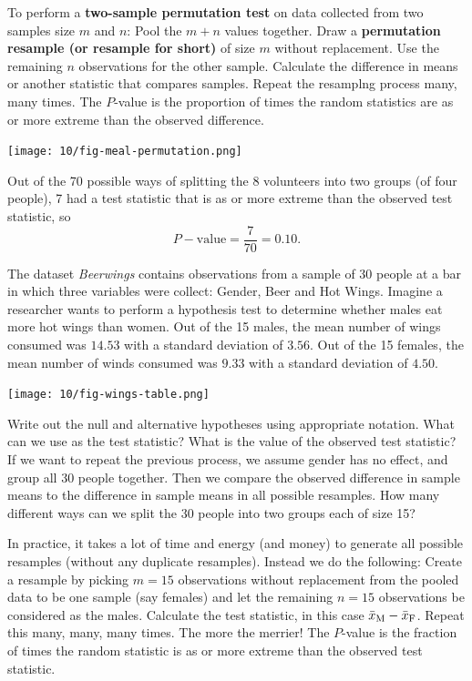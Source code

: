 \bbox
To perform a \textbf{two-sample permutation test} on data collected from two samples size $m$ and $n$:
\bi
\ii Pool the $m+n$ values together.
\ii Draw a \textbf{permutation resample (or resample for short)}  of size $m$ without replacement.
\ii Use the remaining $n$ observations for the other sample.
\ii Calculate the difference in means or another statistic that compares samples.
\ii Repeat the resamplng process many, many times.
\ii The $P$-value is the proportion of times the random statistics are as or more extreme than the observed difference.
\ei
\ebox

\clearpage

\begin{center}
\texttt{[image: 10/fig-meal-permutation.png]}
\end{center}

Out of the 70 possible ways of splitting the 8 volunteers into two groups (of four people), 7 had a test statistic that is as or more extreme than the observed test statistic, so
\[ P-\mbox{value} = \frac{7}{70} = 0.10.\]


\bb[resume]
\ii The dataset \textit{Beerwings} contains observations from a sample of 30 people at a bar in which three variables were collect: Gender, Beer and Hot Wings. Imagine a researcher wants to perform a hypothesis test to determine whether males eat more hot wings than women. Out of the 15 males, the mean number of wings consumed was $14.53$ with a standard deviation of $3.56$. Out of the 15 females, the mean number of winds consumed was $9.33$ with a standard deviation of $4.50$.

\begin{center}
\texttt{[image: 10/fig-wings-table.png]}
\end{center}

\bb
\ii Write out the null and alternative hypotheses using appropriate notation. \vfill
\ii What can we use as the test statistic? What is the value of the observed test statistic? \vfill
\ii If we want to repeat the previous process, we assume gender has no effect, and group all 30 people together. Then we compare the observed difference in sample means to the difference in sample means in all possible resamples. How many different ways can we split the 30 people into two groups each of size 15? \vfill
\ee
\ee

\clearpage

\bbox
In practice, it takes a lot of time and energy (and money) to generate all possible resamples (without any duplicate resamples). Instead we do the following:
\bi
\ii Create a resample by picking $m=15$ observations without replacement from the pooled data to be one sample (say females)
and let the remaining $n=15$ observations be considered as the males.
\ii Calculate the test statistic, in this case $\bar{x}_{\rm{M}} - \bar{x}_{\rm{F}}$.
\ii Repeat this many, many, many times. The more the merrier!
\ii The $P$-value is the fraction of times the random statistic is as or more extreme than the observed test statistic.
\ei
\ebox

